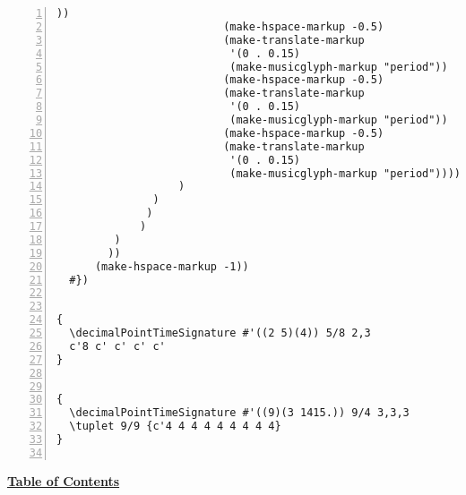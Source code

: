 \begin{Verbatim}[numbers=left,xleftmargin=5mm]
                            ))
                          (make-hspace-markup -0.5)
                          (make-translate-markup
                           '(0 . 0.15)
                           (make-musicglyph-markup "period"))
                          (make-hspace-markup -0.5)
                          (make-translate-markup
                           '(0 . 0.15)
                           (make-musicglyph-markup "period"))
                          (make-hspace-markup -0.5)
                          (make-translate-markup
                           '(0 . 0.15)
                           (make-musicglyph-markup "period"))))
                   )
               )
              )
             )
         )
        ))
      (make-hspace-markup -1))
  #})


{
  \decimalPointTimeSignature #'((2 5)(4)) 5/8 2,3
  c'8 c' c' c' c'
}


{
  \decimalPointTimeSignature #'((9)(3 1415.)) 9/4 3,3,3
  \tuplet 9/9 {c'4 4 4 4 4 4 4 4 4}
}


\end{Verbatim}


\hyperref[sec:toc]{\textbf{Table of Contents}}

\vfill \break

